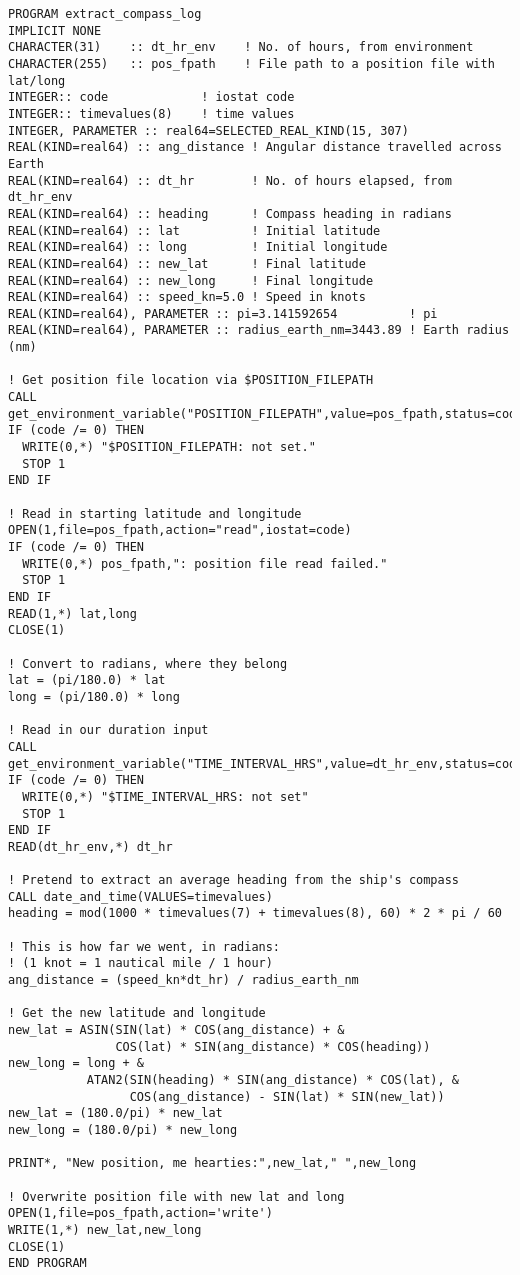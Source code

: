 \lstset{language=Fortran}
\begin{lstlisting}[columns=fullflexible,basicstyle=\small]
PROGRAM extract_compass_log
IMPLICIT NONE
CHARACTER(31)    :: dt_hr_env    ! No. of hours, from environment
CHARACTER(255)   :: pos_fpath    ! File path to a position file with lat/long
INTEGER:: code             ! iostat code
INTEGER:: timevalues(8)    ! time values
INTEGER, PARAMETER :: real64=SELECTED_REAL_KIND(15, 307)
REAL(KIND=real64) :: ang_distance ! Angular distance travelled across Earth
REAL(KIND=real64) :: dt_hr        ! No. of hours elapsed, from dt_hr_env
REAL(KIND=real64) :: heading      ! Compass heading in radians
REAL(KIND=real64) :: lat          ! Initial latitude
REAL(KIND=real64) :: long         ! Initial longitude
REAL(KIND=real64) :: new_lat      ! Final latitude
REAL(KIND=real64) :: new_long     ! Final longitude
REAL(KIND=real64) :: speed_kn=5.0 ! Speed in knots
REAL(KIND=real64), PARAMETER :: pi=3.141592654          ! pi
REAL(KIND=real64), PARAMETER :: radius_earth_nm=3443.89 ! Earth radius (nm)

! Get position file location via $POSITION_FILEPATH
CALL get_environment_variable("POSITION_FILEPATH",value=pos_fpath,status=code)
IF (code /= 0) THEN
  WRITE(0,*) "$POSITION_FILEPATH: not set."
  STOP 1
END IF

! Read in starting latitude and longitude
OPEN(1,file=pos_fpath,action="read",iostat=code)
IF (code /= 0) THEN
  WRITE(0,*) pos_fpath,": position file read failed."
  STOP 1
END IF
READ(1,*) lat,long
CLOSE(1)

! Convert to radians, where they belong
lat = (pi/180.0) * lat
long = (pi/180.0) * long

! Read in our duration input
CALL get_environment_variable("TIME_INTERVAL_HRS",value=dt_hr_env,status=code)
IF (code /= 0) THEN
  WRITE(0,*) "$TIME_INTERVAL_HRS: not set"
  STOP 1
END IF
READ(dt_hr_env,*) dt_hr

! Pretend to extract an average heading from the ship's compass
CALL date_and_time(VALUES=timevalues)
heading = mod(1000 * timevalues(7) + timevalues(8), 60) * 2 * pi / 60

! This is how far we went, in radians:
! (1 knot = 1 nautical mile / 1 hour)
ang_distance = (speed_kn*dt_hr) / radius_earth_nm

! Get the new latitude and longitude
new_lat = ASIN(SIN(lat) * COS(ang_distance) + &
               COS(lat) * SIN(ang_distance) * COS(heading))
new_long = long + &
           ATAN2(SIN(heading) * SIN(ang_distance) * COS(lat), &
                 COS(ang_distance) - SIN(lat) * SIN(new_lat))
new_lat = (180.0/pi) * new_lat
new_long = (180.0/pi) * new_long

PRINT*, "New position, me hearties:",new_lat," ",new_long

! Overwrite position file with new lat and long
OPEN(1,file=pos_fpath,action='write')
WRITE(1,*) new_lat,new_long
CLOSE(1)
END PROGRAM
\end{lstlisting}

